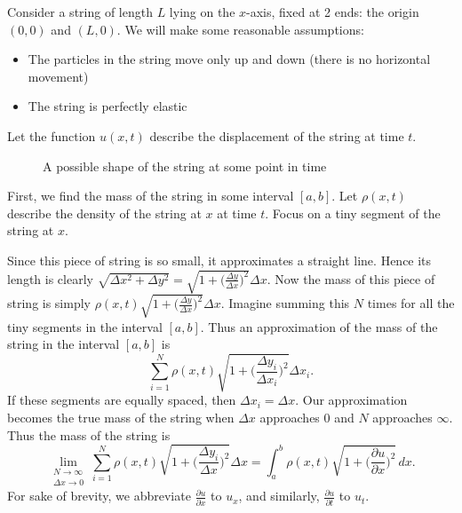 \documentclass{amsart}
\begin{document}
  Consider a string of length $L$ lying on the $x$-axis, fixed at 2 ends: the origin $(0, 0)$ and $(L, 0)$. We will make some reasonable assumptions:
  \begin{itemize}
    \item The particles in the string move only up and down (there is no horizontal movement)
    \item The string is perfectly elastic
  \end{itemize}Let the function $u(x, t)$ describe the displacement of the string at time $t$.
  \begin{figure}[H]
    \centering
    \caption{A possible shape of the string at some point in time}
  \end{figure}
  First, we find the mass of the string in some interval $[a, b]$. Let  $\rho(x, t)$ describe the density of the string at  $x$ at time $t$. Focus on a tiny segment of the string at $x$.
  \begin{figure}[H]
  \end{figure}
  Since this piece of string is so small, it approximates a straight line. Hence its length is clearly $\sqrt{\Delta x^2 + \Delta y^2} = \sqrt{1 + \big(\frac{\Delta y}{\Delta x}\big)^2}\Delta x$. Now the mass of this piece of string is simply $\rho(x, t)\sqrt{1 + \big(\frac{\Delta y}{\Delta x}\big)^2}\Delta x$. Imagine summing this $N$ times for all the tiny segments in the interval $[a, b]$. Thus an approximation of the mass of the string  in the interval $[a, b]$ is \[
    \sum_{i=1}^{N} \rho(x, t)\sqrt{1 + \Big(\frac{\Delta y_i}{\Delta x_i}\Big)^2}\Delta x_i
  .\] If these segments are equally spaced, then $\Delta x_i = \Delta x$. Our approximation becomes the true mass of the string when  $\Delta x$ approaches 0 and $N$ approaches $\infty$. Thus the mass of the string is \[
  \lim_{\substack{N \to \infty \\ \Delta x \to 0}} \sum_{i=1}^{N} \rho(x, t)\sqrt{1 + \Big(\frac{\Delta y_i}{\Delta x}\Big)^2}\Delta x = \int_{a}^{b} \rho(x, t)\sqrt{1 + \Big(\frac{\partial u}{\partial x}\Big)^2}\, dx
.\] For sake of brevity, we abbreviate $\frac{\partial u}{\partial x}$ to  $u_x$, and similarly, $\frac{\partial u}{\partial t}$ to $u_t$.
\end{document}
